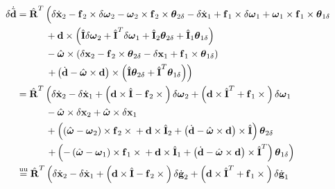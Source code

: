 \documentclass[10pt,dvips,fleqn,subeqn]{report}
\newcommand{\T}[1]{\bm{\mathbf{#1}}}
\newcommand{\TT}[1]{\bm{\mathbf{#1}}}
\newcommand{\equu}{\overset{\text{uu}}{=}}
\begin{document}
\begin{align}
	\delta\dot{\tilde{\T{d}}}
	&=
	\hat{\TT{R}}^T \lplbr{ \vphantom{\plbr{\hat{\TT{I}}^T}}
		\delta\dot{\T{x}}_2
		- \T{f}_2 \times \delta\T{\omega}_{2}
		- \T{\omega}_{2} \times \T{f}_2 \times \T{\theta}_{2\delta}
		- \delta\dot{\T{x}}_1
		+ \T{f}_1 \times \delta\T{\omega}_{1}
		+ \T{\omega}_{1} \times \T{f}_1 \times \T{\theta}_{1\delta}
	} \nonumber \\
	& \quad\quad\quad
	 	+ \T{d}\times\plbr{
			\hat{\TT{I}} \delta\T{\omega}_2
			+ \hat{\TT{I}}^T \delta\T{\omega}_1
			+ \hat{\TT{I}}_2 \T{\theta}_{2\delta}
			+ \hat{\TT{I}}_1 \T{\theta}_{1\delta}
		}
	\nonumber \\
	& \quad\quad\quad
		- \hat{\T{\omega}}\times\plbr{
			\delta\T{x}_2
			- \T{f}_2\times\T{\theta}_{2\delta}
			- \delta\T{x}_1
			+ \T{f}_1\times\T{\theta}_{1\delta}
		}
	\nonumber \\
	& \quad\quad\quad
	\rplbr{
		+ \plbr{
			\dot{\T{d}} - \hat{\T{\omega}}\times\T{d}
		} \times \plbr{
			\hat{\TT{I}} \T{\theta}_{2\delta}
			+ \hat{\TT{I}}^T \T{\theta}_{1\delta}
		}
	}
	\nonumber \\
	&=
	\hat{\TT{R}}^T \lplbr{ \vphantom{\plbr{\hat{\TT{I}}^T}}
		\delta\dot{\T{x}}_2
		- \delta\dot{\T{x}}_1
		+ \plbr{
			\T{d}\times\hat{\TT{I}}
			- \T{f}_2\times{}
		} \delta\T{\omega}_2
		+ \plbr{
			\T{d}\times\hat{\TT{I}}^T
			+ \T{f}_1\times{}
		} \delta\T{\omega}_1
	}
	\nonumber \\
	& \quad\quad\quad
		- \hat{\T{\omega}}\times\delta\T{x}_2
		+ \hat{\T{\omega}}\times\delta\T{x}_1
	\nonumber \\
	& \quad\quad\quad
		+ \plbr{
			\plbr{
				\hat{\T{\omega}}
				- \T{\omega}_2
			}\times\T{f}_2\times{}
			+ \T{d}\times\hat{\TT{I}}_2
			+ \plbr{
				\dot{\T{d}}
				- \hat{\T{\omega}}\times\T{d}
			}\times\hat{\TT{I}}
		} \T{\theta}_{2\delta}
	\nonumber \\
	& \quad\quad\quad
	\rplbr{
		+ \plbr{
			- \plbr{
				\hat{\T{\omega}}
				- \T{\omega}_1
			}\times\T{f}_1\times{}
			+ \T{d}\times\hat{\TT{I}}_1
			+ \plbr{
				\dot{\T{d}}
				- \hat{\T{\omega}}\times\T{d}
			}\times\hat{\TT{I}}^T
		} \T{\theta}_{1\delta}
	}
	\nonumber \\
	&\equu
	\hat{\TT{R}}^T \lplbr{ \vphantom{\plbr{\hat{\TT{I}}^T}}
		\delta\dot{\T{x}}_2
		- \delta\dot{\T{x}}_1
		+ \plbr{
			\T{d}\times\hat{\TT{I}}
			- \T{f}_2\times{}
		} \delta\dot{\T{g}}_2
		+ \plbr{
			\T{d}\times\hat{\TT{I}}^T
			+ \T{f}_1\times{}
		} \delta\dot{\T{g}}_1
	}
	\nonumber \\

\end{align}
\end{document}
